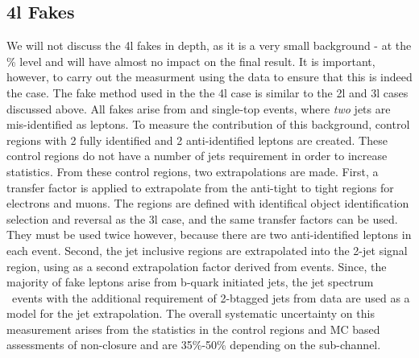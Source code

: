 \subsection{4l Fakes}

We will not discuss the 4l fakes in depth, as it is a very small background - at the \% level and will have almost no impact on the final result. It is important, however, to carry out the measurment using the data to ensure that this is indeed the case. The fake method used in the the 4l case is similar to the 2l and 3l cases discussed above. All fakes arise from \ttbar and single-top events, where {\it two} jets are mis-identified as leptons. To measure the contribution of this background, control regions with 2 fully identified and 2 anti-identified leptons are created. These control regions do not have a number of jets requirement in order to increase statistics.  From these control regions, two extrapolations are made. First, a transfer factor is applied to extrapolate from the anti-tight to tight regions for electrons and muons. The regions are defined with identifical object identification selection and reversal as the 3l case, and the same transfer factors can be used. They must be used twice however, because there are two anti-identified leptons in each event. Second, the jet inclusive regions are extrapolated into the 2-jet signal region, using as a second extrapolation factor derived from \ttbar events. Since, the majority of fake leptons arise from b-quark initiated jets, the jet spectrum \ttbar\ events with the additional requirement of 2-btagged jets from data are used as a model for the jet extrapolation. The overall systematic uncertainty on this measurement arises from the statistics in the control regions and MC based assessments of non-closure and are 35\%-50\% depending on the sub-channel. 


